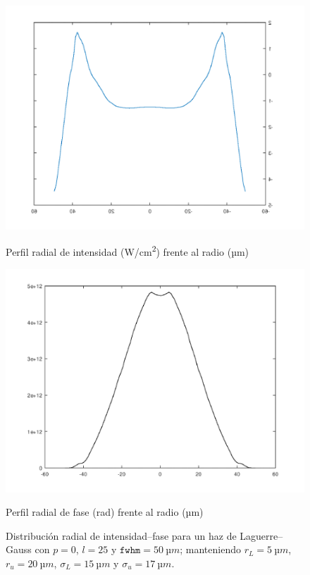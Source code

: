 \begin{figure}[htbp]
  \centering
  \begin{subcaptionblock}{.4\textwidth}
    \centering
    \includegraphics[width=\textwidth]{Figuras/anx_oamfs_9.png}
    \caption*{Perfil radial de intensidad (\unit{W/cm^2}) frente al radio (\unit{µm})}
  \end{subcaptionblock}
  \begin{subcaptionblock}{.4\textwidth}
    \centering
    \includegraphics[width=\textwidth]{Figuras/anx_oamint_9.png}
    \caption*{Perfil radial de fase (\unit{rad}) frente al radio (\unit{µm})}
  \end{subcaptionblock}
   \caption*{Distribución radial de intensidad--fase para un haz de Laguerre--Gauss con $p=0$, $l=25$ y $\texttt{fwhm}=\qty{50}{µm}$; manteniendo $r_{L}=\qty{5}{µm}$, $r_{u}=\qty{20}{µm}$, $\sigma_{L}=\qty{15}{µm}$ y $\sigma_{u}=\qty{17}{µm}$.}
\end{figure}

